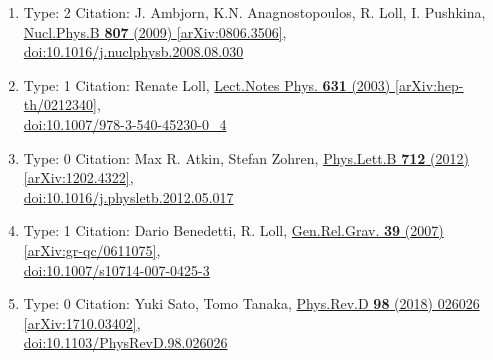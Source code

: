 \documentclass[a4paper,10pt]{article}
\begin{document}
\begin{enumerate}
\begin{enumerate}
  \item Type: 2 Citation: J. Ambjorn, K.N. Anagnostopoulos, R. Loll, I. Pushkina, \href{https://www.doi.org/10.1016/j.nuclphysb.2008.08.030}{Nucl.Phys.B {\bf 807} (2009) }  \href{https://arxiv.org/abs/0806.3506}{[arXiv:0806.3506]},\\\href{https://www.doi.org/10.1016/j.nuclphysb.2008.08.030}{doi:10.1016/j.nuclphysb.2008.08.030}
  \item Type: 1 Citation: Renate Loll, \href{https://www.doi.org/10.1007/978-3-540-45230-0_4}{Lect.Notes Phys. {\bf 631} (2003) }  \href{https://arxiv.org/abs/hep-th/0212340}{[arXiv:hep-th/0212340]},\\\href{https://www.doi.org/10.1007/978-3-540-45230-0_4}{doi:10.1007/978-3-540-45230-0\_4}
  \item Type: 0 Citation: Max R. Atkin, Stefan Zohren, \href{https://www.doi.org/10.1016/j.physletb.2012.05.017}{Phys.Lett.B {\bf 712} (2012) }  \href{https://arxiv.org/abs/1202.4322}{[arXiv:1202.4322]},\\\href{https://www.doi.org/10.1016/j.physletb.2012.05.017}{doi:10.1016/j.physletb.2012.05.017}
  \item Type: 1 Citation: Dario Benedetti, R. Loll, \href{https://www.doi.org/10.1007/s10714-007-0425-3}{Gen.Rel.Grav. {\bf 39} (2007) }  \href{https://arxiv.org/abs/gr-qc/0611075}{[arXiv:gr-qc/0611075]},\\\href{https://www.doi.org/10.1007/s10714-007-0425-3}{doi:10.1007/s10714-007-0425-3}
  \item Type: 0 Citation: Yuki Sato, Tomo Tanaka, \href{https://www.doi.org/10.1103/PhysRevD.98.026026}{Phys.Rev.D {\bf 98} (2018) 026026}  \href{https://arxiv.org/abs/1710.03402}{[arXiv:1710.03402]},\\\href{https://www.doi.org/10.1103/PhysRevD.98.026026}{doi:10.1103/PhysRevD.98.026026}

\end{enumerate}
\end{enumerate}
\end{document}
